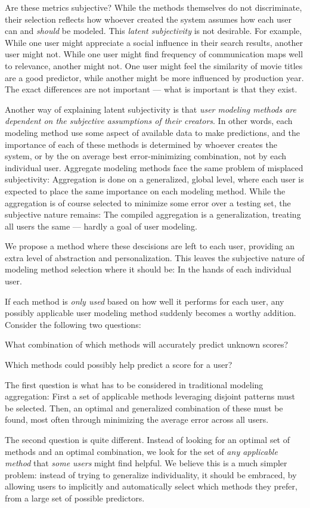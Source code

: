 Are these metrics subjective? 
While the methods themselves do not discriminate, their selection
reflects how whoever created the system assumes how each user
can and \emph{should} be modeled. This \emph{latent subjectivity} is not desirable.
For example, While one user might appreciate a social
influence in their search results, another user might not.
While one user might find frequency of communication maps well to relevance,
another might not. 
One user might feel the similarity of movie titles are a good predictor,
while another might be more influenced by production year.
The exact differences are not important --- what is important is that they exist.

Another way of explaining latent subjectivity is that 
\emph{user modeling methods are dependent on the subjective assumptions of their creators}.
In other words, each modeling method use some aspect of available data to make predictions,
and the importance of each of these methods is determined by whoever creates the system,
or by the on average best error-minimizing combination, not by each individual user.
Aggregate modeling methods face the same problem of misplaced subjectivity: 
Aggregation is done on a generalized, global level,
where each user is expected to place the same importance on each modeling method.
While the aggregation is of course selected to minimize some error over a testing set,
the subjective nature remains: The compiled aggregation is a generalization,
treating all users the same --- hardly a goal of user modeling.

We propose a method where these descisions are left to each user,
providing an extra level of abstraction and personalization.
This leaves the subjective nature of modeling method selection where it should be:
In the hands of each individual user.

If each method is \emph{only used} based on how well it performs for each user,
any possibly applicable user modeling method suddenly becomes a worthy addition.
Consider the following two questions:

\begin{enumerate*}
  \item What combination of which methods will accurately predict unknown scores?
  \item Which methods could possibly help predict a score for a user?
\end{enumerate*}

The first question is what has to be considered in traditional modeling aggregation:
First a set of applicable methods leveraging disjoint patterns must be selected. 
Then, an optimal and generalized combination of these must be found,
most often through minimizing the average error across all users.

The second question is quite different. 
Instead of looking for an optimal set of methods and an optimal combination,
we look for the set of \emph{any applicable method} that \emph{some users} might find helpful.
We believe this is a much simpler problem: 
instead of trying to generalize individuality,
it should be embraced, by allowing users to implicitly and automatically select which methods they prefer,
from a large set of possible predictors.


